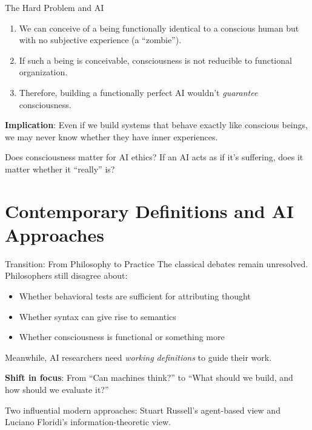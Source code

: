 ﻿\documentclass[aspectratio=169,11pt]{beamer}
\begin{document}
\begin{frame}{The Hard Problem and AI}
\begin{objectionbox}
\small
\begin{enumerate}
    \item We can conceive of a being functionally identical to a conscious human but with no subjective experience (a ``zombie'').
    \item If such a being is conceivable, consciousness is not reducible to functional organization.
    \item Therefore, building a functionally perfect AI wouldn't \emph{guarantee} consciousness.
\end{enumerate}
\end{objectionbox}

\vspace{0.1em}
\textbf{Implication}: Even if we build systems that behave exactly like conscious beings, we may never know whether they have inner experiences.

\vspace{0.1em}
\begin{discussionbox}[Discussion]
Does consciousness matter for AI ethics? If an AI acts as if it's suffering, does it matter whether it ``really'' is?
\end{discussionbox}
\end{frame}

\section{Contemporary Definitions and AI Approaches}

\begin{frame}{Transition: From Philosophy to Practice}
The classical debates remain unresolved. Philosophers still disagree about:
\begin{itemize}
    \item Whether behavioral tests are sufficient for attributing thought
    \item Whether syntax can give rise to semantics
    \item Whether consciousness is functional or something more
\end{itemize}

\vspace{0.3em}
Meanwhile, AI researchers need \emph{working definitions} to guide their work.

\vspace{0.3em}
\textbf{Shift in focus}: From ``Can machines think?'' to ``What should we build, and how should we evaluate it?''

\vspace{0.3em}
Two influential modern approaches: Stuart Russell's agent-based view and Luciano Floridi's information-theoretic view.
\end{frame}
\end{document}
